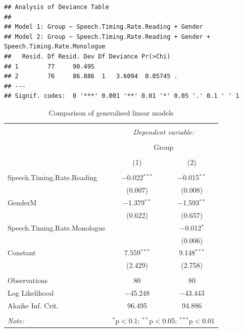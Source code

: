 \documentclass[
  english,
  doc,floatsintext]{apa6}
\begin{document}
\begin{verbatim}
## Analysis of Deviance Table
## 
## Model 1: Group ~ Speech.Timing.Rate.Reading + Gender
## Model 2: Group ~ Speech.Timing.Rate.Reading + Gender + Speech.Timing.Rate.Monologue
##   Resid. Df Resid. Dev Df Deviance Pr(>Chi)  
## 1        77     90.495                       
## 2        76     86.886  1   3.6094  0.05745 .
## ---
## Signif. codes:  0 '***' 0.001 '**' 0.01 '*' 0.05 '.' 0.1 ' ' 1
\end{verbatim}

\begin{table}[!htbp] \centering 
  \caption{Comparison of generalised linear models} 
  \label{} 
\begin{tabular}{@{\extracolsep{5pt}}lcc} 
\\[-1.8ex]\hline 
\hline \\[-1.8ex] 
 & \multicolumn{2}{c}{\textit{Dependent variable:}} \\ 
\cline{2-3} 
\\[-1.8ex] & \multicolumn{2}{c}{Group} \\ 
\\[-1.8ex] & (1) & (2)\\ 
\hline \\[-1.8ex] 
 Speech.Timing.Rate.Reading & $-$0.022$^{***}$ & $-$0.015$^{**}$ \\ 
  & (0.007) & (0.008) \\ 
  GenderM & $-$1.379$^{**}$ & $-$1.593$^{**}$ \\ 
  & (0.622) & (0.657) \\ 
  Speech.Timing.Rate.Monologue &  & $-$0.012$^{*}$ \\ 
  &  & (0.006) \\ 
  Constant & 7.559$^{***}$ & 9.148$^{***}$ \\ 
  & (2.429) & (2.758) \\ 
 \hline \\[-1.8ex] 
Observations & 80 & 80 \\ 
Log Likelihood & $-$45.248 & $-$43.443 \\ 
Akaike Inf. Crit. & 96.495 & 94.886 \\ 
\hline 
\hline \\[-1.8ex] 
\textit{Note:}  & \multicolumn{2}{r}{$^{*}$p$<$0.1; $^{**}$p$<$0.05; $^{***}$p$<$0.01} \\ 
\end{tabular} 
\end{table}
\end{document}
